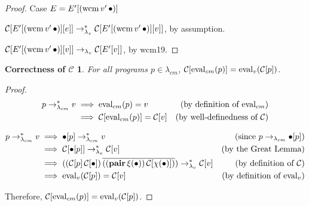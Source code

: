 \begin{proof}{Case $E=E'[(\mathrm{wcm}\,v'\,\bullet)]$}

$\mathcal{C}[E'[(\mathrm{wcm}\,v'\,\bullet)][e]]\rightarrow_{\lambda_v}^{*}\mathcal{C}[E'[(\mathrm{wcm}\,v'\,\bullet)][v]]$, by assumption.

$\mathcal{C}[E'[(\mathrm{wcm}\,v'\,\bullet)][v]]\rightarrow_{\lambda_v} \mathcal{C}[E'[v]]$, by wcm19. 
\end{proof}

\newtheorem*{maintheoreme}{Correctness of $\mathcal{C}$}
\begin{maintheoreme}
For all programs $p\in\lambda_{cm}$, $\mathcal{C}[\mathrm{eval}_{cm}(p)]=\mathrm{eval}_{v}(\mathcal{C}[p])$.
\end{maintheoreme}

\begin{proof}

\begin{align*}
p\rightarrow_{\lambda_{cm}}^{*} v &\implies\mathrm{eval}_{cm}(p)=v &\text{(by definition of $\mathrm{eval}_{cm}$)}\\
          &\implies\mathcal{C}[\mathrm{eval}_{cm}(p)]=\mathcal{C}[v] &\text{(by well-definedness of $\mathcal{C}$)}
\end{align*}







\begin{align*}
p\rightarrow_{\lambda_{cm}}^{*} v &\implies\bullet[p]\rightarrow_{\lambda_{cm}}^{*} v &\text{(since $p\rightarrow_{\lambda_{cm}}\bullet[p]$)}\\
          &\implies\mathcal{C}[\bullet[p]]\rightarrow_{\lambda_v}^{*}\mathcal{C}[v] &\text{(by the Great Lemma)}\\
          &\implies((\mathcal{C}[p]\,\mathcal{C}[\bullet])\,\overline{((\mathbf{pair}\,\xi(\bullet))\,\mathcal{C}[\chi(\bullet)])})\rightarrow_{\lambda_v}^{*}\mathcal{C}[v]&\text{(by definition of $\mathcal{C}$)}\\
          &\implies\mathrm{eval}_{v}(\mathcal{C}[p])=\mathcal{C}[v] &\text{(by definition of $\mathrm{eval}_v$)}
\end{align*}

Therefore, $\mathcal{C}[\mathrm{eval}_{cm}(p)]=\mathrm{eval}_{v}(\mathcal{C}[p])$.
\end{proof}

